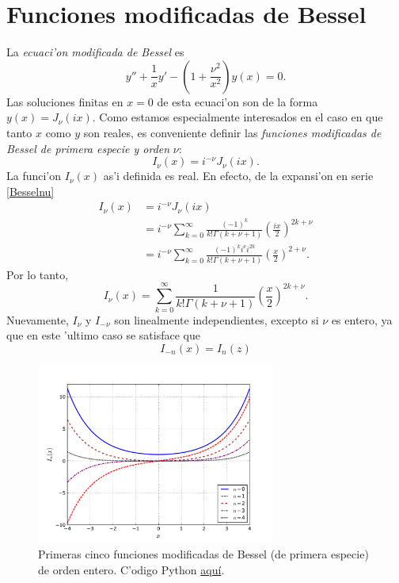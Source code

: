 
\section{Funciones modificadas de Bessel}
La \textit{ecuaci'on modificada de Bessel} es 
\begin{equation} 
y'' + \frac{1}{x}y' -\left(1+\frac{\nu^2}{x^2}\right)y(x) = 0. 
\end{equation}
Las soluciones finitas en $x=0$ de esta ecuaci'on son de la forma $y(x)=J_\nu(ix)$. Como estamos especialmente interesados en el caso en que tanto $x$ como $y$ son reales, es conveniente  definir las \textit{funciones modificadas de Bessel de primera especie y orden} $\nu$:
\begin{equation}\label{defInu}
I_\nu(x) = i^{-\nu} J_\nu(ix). 
\end{equation}
La funci'on $I_\nu(x)$ as'i definida es real. En efecto, de la expansi'on en serie \eqref{Besselnu}
\begin{align}
  I_\nu(x) &= i^{-\nu} J_\nu(ix)   \\
  &= i^{-\nu}\sum_{k=0}^\infty\frac{(-1)^k}{k!\Gamma(k+\nu+1)}
  \left(\frac{ix}{2}\right)^{2k+\nu} \\
  &= i^{-\nu} \sum_{k=0}^\infty \frac{(-1)^k i^\nu i^{2k}}{k!\Gamma(k+\nu+1)} 
  \left(\frac{x}{2}\right)^{2+\nu}.
\end{align}
Por lo tanto,
\begin{equation}
\boxed{I_\nu(x) = \sum_{k=0}^\infty\frac{1}{k!\Gamma(k+\nu+ 1)}
  \left(\frac{x}{2}\right)^{2k+\nu}.}
\end{equation}
Nuevamente, $I_\nu$ y $I_{-\nu}$ son linealmente independientes, excepto si $\nu$ es entero, ya que en este 'ultimo caso se satisface que
\begin{equation}
I_{-n}(x)=I_n(z)
\end{equation}
\begin{figure}[H]
\centering
\includegraphics[angle=0,width=0.7\textwidth]{figs/fig-Bessel-I.pdf}
\caption{Primeras cinco funciones modificadas de Bessel (de primera especie) de orden entero. C'odigo Python \href{https://github.com/gfrubi/FM2/blob/master/figuras-editables/fig-Bessel.py}{aqu\'i}.}
\label{fig-In}
\end{figure}
